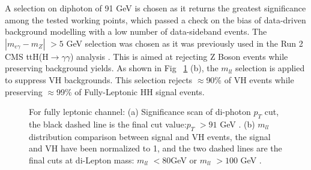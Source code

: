 A selection on diphoton \pt of 91 GeV is chosen as it returns the greatest significance among the tested working points, which passed a check on the bias of data-driven background modelling with a low number of data-sideband events.
The $| m_{e\gamma} - m_Z |$ $>5$ GeV selection was chosen as it was previously used in the Run 2 CMS ttH(H$\rightarrow\gamma\gamma$) analysis \cite{CMS:ttH}. This is aimed at rejecting Z Boson events while preserving background yields.
As shown in Fig ~\ref{fig:FL_support} (b), the $m_{ll}$ selection is applied to suppress VH backgrounds. This selection rejects $\approx$90\% of VH events while preserving $\approx$99\% of Fully-Leptonic HH signal events.
\begin{figure}[!htbp]
  \begin{center}
    \caption{
      For fully leptonic channel: (a) Significance scan of di-photon $p_{T}$ cut, the black dashed line is the final cut value:$p_{T}$ $> 91$ GeV . (b) $m_{ll}$ distribution comparison between signal and VH events, the signal and VH have been normalized to 1, and the two dashed lines are the final cuts at di-Lepton mass: $m_{ll}$ $< 80$GeV or $m_{ll}$ $> 100$ GeV .
    }
    \label{fig:FL_support}
  \end{center}
\end{figure}

